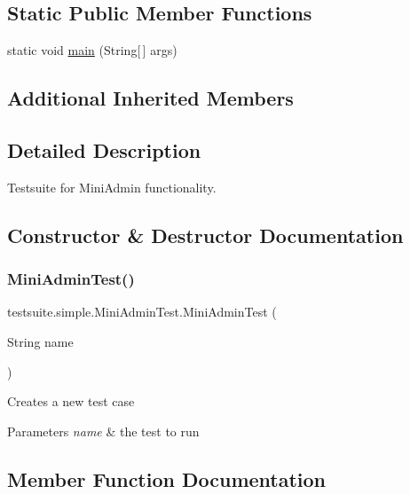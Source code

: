 \subsection*{Static Public Member Functions}
\begin{DoxyCompactItemize}
\item 
static void \mbox{\hyperlink{classtestsuite_1_1simple_1_1_mini_admin_test_a8a37b0ac4e247a37872c7854f9a52ae7}{main}} (String\mbox{[}$\,$\mbox{]} args)
\end{DoxyCompactItemize}
\subsection*{Additional Inherited Members}


\subsection{Detailed Description}
Testsuite for Mini\+Admin functionality. 

\subsection{Constructor \& Destructor Documentation}
\mbox{\label{classtestsuite_1_1simple_1_1_mini_admin_test_a3a0ed00e5b6b2feb4b9a2102c94fac02}} 
\subsubsection{\texorpdfstring{Mini\+Admin\+Test()}{MiniAdminTest()}}
{\footnotesize\ttfamily testsuite.\+simple.\+Mini\+Admin\+Test.\+Mini\+Admin\+Test (\begin{DoxyParamCaption}\item[{String}]{name }\end{DoxyParamCaption})}

Creates a new test case


\begin{DoxyParams}{Parameters}
{\em name} & the test to run \\
\hline
\end{DoxyParams}


\subsection{Member Function Documentation}
\mbox{\label{classtestsuite_1_1simple_1_1_mini_admin_test_a8a37b0ac4e247a37872c7854f9a52ae7}} 
